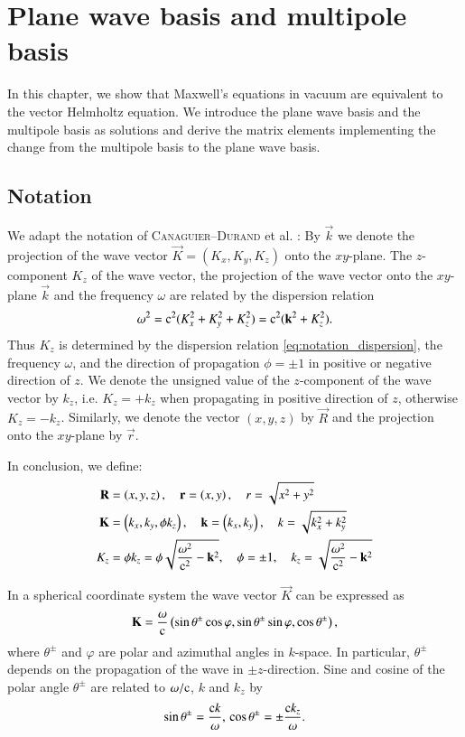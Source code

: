 \chapter{Plane wave basis and multipole basis}


In this chapter, we show that Maxwell's equations in vacuum are equivalent to
the vector Helmholtz equation. We introduce the plane wave basis and the
multipole basis as solutions and derive the matrix elements implementing the
change from the multipole basis to the plane wave basis.


\section{Notation}

We adapt the notation of \textsc{Canaguier--Durand} et al. \cite{Durand,
ThermalCasimirEffect}: By $\vec k$ we denote the projection of the wave vector
$\vec K=(K_x, K_y, K_z)$ onto the $xy$-plane. The $z$-component $K_z$ of the
wave vector, the projection of the wave vector onto the $xy$-plane $\vec k$ and
the frequency $\omega$ are related by the dispersion relation
\begin{equation}
\label{eq:notation_dispersion}
\omega^2 = \mathrm{c}^2(K_x^2 + K_y^2 + K_z^2) = \mathrm{c}^2({\mathbf{k}}^2 + K_z^2).
\end{equation}
Thus $K_z$ is determined by the dispersion relation
\eqref{eq:notation_dispersion}, the frequency $\omega$, and the direction of
propagation $\phi=\pm1$ in positive or negative direction of $z$. We denote the
unsigned value of the $z$-component of the wave vector by $k_z$, i.e.
$K_z=+k_z$ when propagating in positive direction of $z$, otherwise $K_z =
-k_z$. Similarly, we denote the vector $(x,y,z)$ by $\vec R$ and the
projection onto the $xy$-plane by $\vec r$.

In conclusion, we define:
\begin{align}
{\mathbf{R}} &= \left(x, y, z\right), \quad {\mathbf{r}} = \left(x,y\right), \quad r = \sqrt{x^2+y^2} \\
{\mathbf{K}} &= \left(k_x, k_y, \phi k_z\right), \quad {\mathbf{k}} = \left(k_x,k_y\right), \quad k = \sqrt{k_x^2+k_y^2} \\
K_z &= \phi k_z = \phi \sqrt{\frac{\omega^2}{\mathrm{c}^2}-{\mathbf{k}}^2}, \quad \phi = \pm 1, \quad k_z = \sqrt{\frac{\omega^2}{\mathrm{c}^2}-{\mathbf{k}}^2}
\end{align}

In a spherical coordinate system the wave vector $\vec K$ can be expressed as
\begin{equation}
{\mathbf{K}} = \frac{\omega}{\mathrm{c}} \left(\sin\theta^\pm \cos\varphi, \sin\theta^\pm \sin\varphi, \cos\theta^\pm \right),
\end{equation}
where $\theta^\pm$ and $\varphi$ are polar and azimuthal angles in $k$-space.
In particular, $\theta^\pm$ depends on the propagation of the wave in $\pm
z$-direction. Sine and cosine of the polar angle $\theta^\pm$ are related to
$\omega/\mathrm{c}$, $k$ and $k_z$ by
\begin{equation}
\label{eq:notation_cossintheta}
\sin\theta^\pm = \frac{\mathrm{c} k}{\omega}, \\
\cos\theta^\pm = \pm\frac{\mathrm{c} k_z}{\omega}.
\end{equation}

